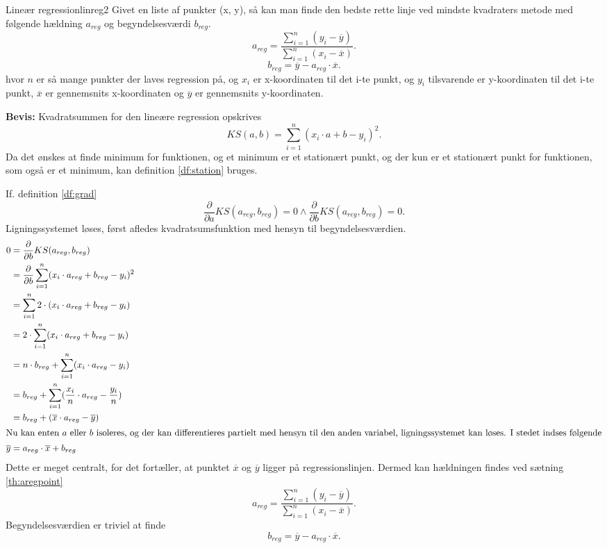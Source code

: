 \documentclass{article}
\begin{document}
\begin{theorem}{Lineær regression}{linreg2}
	Givet en liste af punkter (x, y), så kan man finde den bedste rette linje
	ved mindste kvadraters metode med følgende hældning $a_{reg}$ og
	begyndelsesværdi $b_{reg}$.
	\[
		a_{reg} = \frac{\sum_{i=1}^n (y_i-\overline{y})}{\sum_{i=1}^n (x_i-\overline{x})}.
	\] 
	\[
		b_{reg} = \overline{y} - a_{reg} \cdot \overline{x}.
	\] 
	hvor $n$ er så mange punkter der laves regression på, og $x_i$ er x-koordinaten
	til det i-te punkt, og $y_i$ tilsvarende er y-koordinaten til det i-te punkt,
	$\overline{x}$ er gennemsnits x-koordinaten og $\overline{y}$ er
	gennemsnits y-koordinaten.
\end{theorem}

\textbf{Bevis:}
Kvadratsummen for den lineære regression opskrives
\[
	KS(a, b) = \sum_{i=1}^n (x_i \cdot a + b - y_i)^2.
\] 
Da det ønskes at finde minimum for funktionen, og et minimum er et stationært
punkt, og der kun er et stationært punkt for funktionen, som også er et
minimum, kan definition \ref{df:station} bruges.

\smallskip

If. definition \ref{df:grad}
\[
	\frac{\partial}{\partial a} KS(a_{reg}, b_{reg}) = 0 \land
	\frac{\partial}{\partial b} KS(a_{reg}, b_{reg}) = 0.
\] 
Ligningssystemet løses, først afledes kvadratsumsfunktion med hensyn til
begyndelsesværdien.
\begin{align*}
	0 &= \frac{\partial}{\partial b} KS(a_{reg}, b_{reg})\\
	  &= \frac{\partial}{\partial b} \sum_{i=1}^n (x_i \cdot a_{reg} + b_{reg} - y_i)^2\\
	  &= \sum_{i=1}^n 2 \cdot (x_i \cdot a_{reg} + b_{reg} - y_i)\\
	  &= 2 \cdot \sum_{i=1}^n (x_i \cdot a_{reg} + b_{reg} - y_i)\\
	  &= n \cdot b_{reg} + \sum_{i=1}^n (x_i \cdot a_{reg} - y_i)\\
	  &= b_{reg} + \sum_{i=1}^n (\frac{x_i}{n} \cdot a_{reg} - \frac{y_i}{n})\\
	  &= b_{reg} + (\overline{x} \cdot a_{reg} - \overline{y})\\
	  \intertext{Nu kan enten $a$ eller $b$ isoleres, og der kan differentieres
		  partielt med hensyn til den anden variabel, ligningssystemet kan
	  løses. I stedet indses følgende}
	\overline{y} &= a_{reg} \cdot \overline{x} + b_{reg}
\end{align*}
Dette er meget centralt, for det fortæller, at punktet $\overline{x}$ og
$\overline{y}$ ligger på regressionslinjen. Dermed kan hældningen findes ved
sætning \ref{th:aregpoint}
\[
	a_{reg} = \frac{\sum_{i=1}^n (y_i-\overline{y})}{\sum_{i=1}^n (x_i-\overline{x})}.
\] 
Begyndelsesværdien er triviel at finde
\[
	b_{reg} = \overline{y} - a_{reg} \cdot \overline{x}.
\] 
\end{document}
